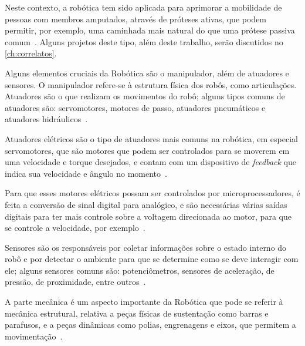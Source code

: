Neste contexto, a robótica tem sido aplicada para aprimorar a mobilidade de pessoas com membros amputados, através de próteses ativas, que podem permitir, por exemplo, uma caminhada mais natural do que uma prótese passiva comum~\cite{dedic:2011}. Alguns projetos deste tipo, além deste trabalho, serão discutidos no \autoref{ch:correlatos}.

Alguns elementos cruciais da Robótica são o manipulador, além de atuadores e sensores. O manipulador refere-se à estrutura física dos robôs, como articulações. Atuadores são o que realizam os movimentos do robô; alguns tipos comuns de atuadores são: servomotores, motores de passo, atuadores pneumáticos e atuadores hidráulicos~\cite{niku:2010robotics_intro}.

Atuadores elétricos são o tipo de atuadores mais comuns na robótica, em especial servomotores, que são motores que podem ser controlados para se moverem em uma velocidade e torque desejados, e contam com um dispositivo de \textit{feedback} que indica sua velocidade e ângulo no momento~\cite{niku:2010robotics_intro}.

Para que esses motores elétricos possam ser controlados por microprocessadores, é feita a conversão de sinal digital para analógico, e são necessárias várias saídas digitais para ter mais controle sobre a voltagem direcionada ao motor, para que se controle a velocidade, por exemplo~\cite{niku:2010robotics_intro}.

Sensores são os responsáveis por coletar informações sobre o estado interno do robô e por detectar o ambiente para que se determine como se deve interagir com ele; alguns sensores comuns são: potenciômetros, sensores de aceleração, de pressão, de proximidade, entre outros~\cite{niku:2010robotics_intro}.

A parte mecânica é um aspecto importante da Robótica que pode se referir à mecânica estrutural, relativa a peças físicas de sustentação como barras e parafusos, e a peças dinâmicas como polias, engrenagens e eixos, que permitem a movimentação~\cite{modelix:2010guia_robotica}.


